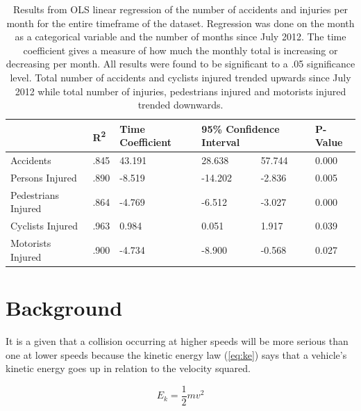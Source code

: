 \documentclass[10pt,journal,compsoc]{IEEEtran}
\begin{document}
\begin{table}[]
\centering
\caption{Results from OLS linear regression of the number of accidents and injuries per month for the entire timeframe of the dataset.  Regression was done on the month as a categorical variable and the number of months since July 2012.  The time coefficient gives a measure of how much the monthly total is increasing or decreasing per month.  All results were found to be significant to a .05 significance level.  Total number of accidents and cyclists injured trended upwards since July 2012 while total number of injuries, pedestrians injured and motorists injured trended downwards. }
\label{tab:timeline}
\begin{tabular}{|l|l|l|l|l|l|}
\hline
                    & R\textsuperscript{2}   & Time Coefficient & \multicolumn{2}{l|}{95\% Confidence Interval} & P-Value \\ \hline
Accidents           & .845 & 43.191          & 28.638                 & 57.744               & 0.000   \\ \hline
Persons Injured     & .890 & -8.519          & -14.202                & -2.836               & 0.005   \\ \hline
Pedestrians Injured & .864 & -4.769          & -6.512                 & -3.027               & 0.000   \\ \hline
Cyclists Injured    & .963 & 0.984           & 0.051                  & 1.917                & 0.039   \\ \hline
Motorists Injured   & .900 & -4.734          & -8.900                 & -0.568               & 0.027   \\ \hline
\end{tabular}
\end{table}






\section{Background}

It is a given that a collision occurring at higher speeds will be more serious than one at lower speeds because the kinetic energy law (\ref{eq:ke}) says that a vehicle's kinetic energy goes up in relation to the velocity squared. 

\begin{equation}
\label{eq:ke}
E_{k} = \frac{1}{2} mv^2
\end{equation}
\end{document}
